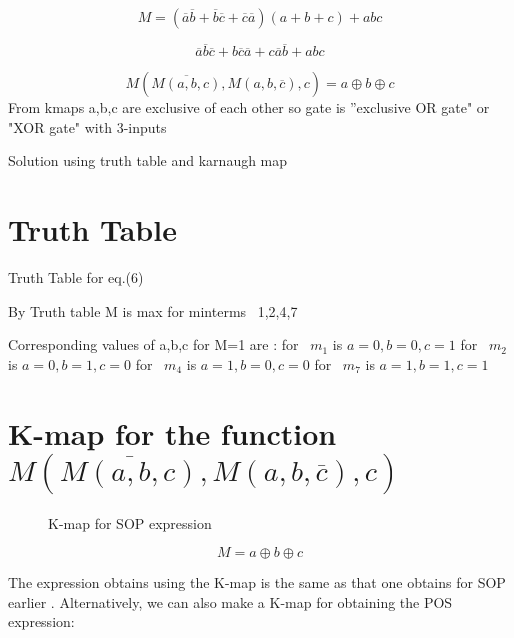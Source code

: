 \documentclass{article}
\begin{document}
\begin{equation}
M=(\overline{a}\overline{b}+\overline{b}\overline{c}+\overline{c}\overline{a})(a+b+c)+abc
\end{equation}

\begin{equation}
    \overline{a}\overline{b}\overline{c}+b\overline{c}\overline{a}+c\overline{a}\overline{b}+abc
\end{equation}

\begin{equation}
 M(\overline{M(a,b,c)},M(a,b,\overline{c}),c)  = a\oplus b\oplus c   
\end{equation}
From kmaps a,b,c are exclusive of each other so gate is ''exclusive OR gate" or "XOR gate" with 3-inputs

Solution using truth table and karnaugh map 


\section{Truth Table}
\begin{table}[!h]
\centering
\scalebox{1.6}{

}
\caption{Truth Table for eq.(6)}
\label{table1}
\end{table}

By Truth table M is max for minterms \ 1,2,4,7

Corresponding values of a,b,c for M=1 are : 
\newline for \ $m_1$ is $a=0,b=0,c=1$
\newline for \ $m_2$ is $a=0,b=1,c=0$
\newline for \ $m_4$ is $a=1,b=0,c=0$
\newline for \ $m_7$ is $a=1,b=1,c=1$

\section{K-map for the function $M(\overline{M(a,b,c)},M(a,b,\overline{c}),c)$}
\begin{figure}[h]
\centering

\caption{K-map for SOP expression}
\label{kmap_SOP}
\end{figure} 

\begin{equation}
    M=a \oplus b \oplus c
\end{equation}

The expression obtains using the K-map is the same as that one obtains for SOP earlier . Alternatively, we can also make a K-map for obtaining the POS expression:
\end{document}
